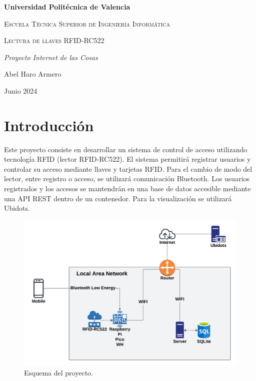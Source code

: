\documentclass{article}
\begin{document}
\begin{titlepage}
\centering
{\bfseries\LARGE Universidad Politécnica de Valencia\par}
\vspace{1cm}
{\scshape\Large Escuela Técnica Superior de Ingeniería Informática\par}
\vspace{3cm}
{\scshape\Huge Lectura de llaves RFID-RC522 \par}
\vspace{3cm}
{\itshape\Large Proyecto Internet de las Cosas\par}
\vfill
{\Large Abel Haro Armero \par}
\vfill
{\Large Junio 2024 \par}
\date{}
\end{titlepage}



\tableofcontents


\section{Introducción}

Este proyecto consiste en desarrollar un sistema de control de acceso utilizando tecnología RFID (lector RFID-RC522).
El sistema permitirá registrar usuarios y controlar su acceso mediante llaves y tarjetas RFID. Para el cambio de modo del lector, entre registro o acceso, se utilizará comunicación Bluetooth. Los usuarios registrados y los accesos se mantendrán en una base de datos accesible mediante una API REST dentro de un contenedor. Para la visualización se utilizará Ubidots.

\begin{figure}[ht!]
\centering
\includegraphics[width=0.9\linewidth]{../images/esquema_proyecto.png}
\caption{\label{fig:esquema red}Esquema del proyecto.}
\end{figure}
\end{document}
